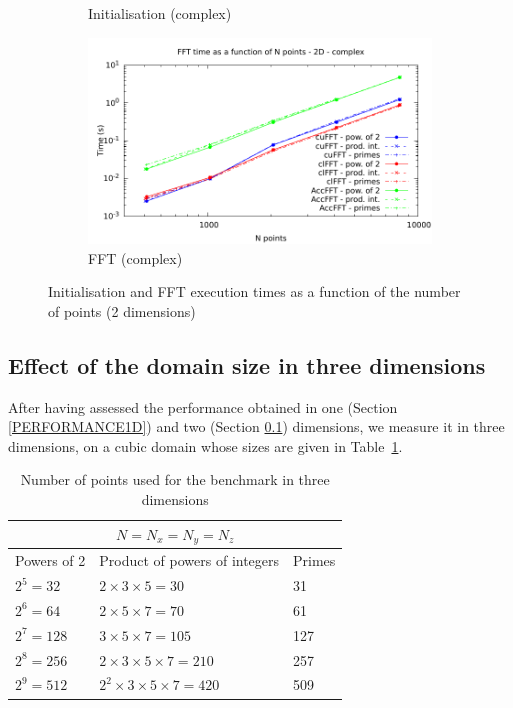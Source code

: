 \documentclass[12pt, a4paper]{article}
\begin{document}
\begin{figure}[htb]
\begin{subfigure}{.5\textwidth}
\caption{Initialisation (complex)}
\label{FFT2DCI}
\end{subfigure}%
\begin{subfigure}{.5\textwidth}
\centering
\includegraphics[width=.9\linewidth]{graphs/fft-2d-c-exec.pdf}
\caption{FFT (complex)}
\label{FFT2DCE}
\end{subfigure}
\caption{Initialisation and FFT execution times as a function of the number of points (2 dimensions)}
\label{FFT2D}
\end{figure}


\subsection{Effect of the domain size in three dimensions}\label{PERFORMANCE3D}
After having assessed the performance obtained in one (Section
\ref{PERFORMANCE1D}) and two (Section \ref{PERFORMANCE3D}) dimensions,
we measure it in three dimensions, on a cubic domain whose sizes are
given in Table~\ref{3DSIZES}.

\begin{table}[H]
  \centering
  \captionsetup{width=0.8\linewidth}
\begin{tabular}{|l|l|l|}
  \hline
  \multicolumn{3}{|c|}{$N=N_x=N_y=N_z$}\\
  \hline
  \hline
Powers of 2 & Product of powers of integers & Primes\\ \hline
$2^5 = 32$ & $2\times 3\times 5 =	30$ & 31\\ \hline
$2^6 = 64$ & $2\times 5\times 7 = 70$ & 61\\ \hline
$2^7 = 128$ & $3\times 5\times 7 = 105$ & 127\\ \hline
$2^8 = 256$ & $2\times 3\times 5\times 7 = 210$ & 257\\ \hline
$2^9 = 512$ & $2^2\times 3\times 5\times 7 = 420$ & 509\\ \hline
\end{tabular}
\caption{Number of points used for the benchmark in three dimensions}\label{3DSIZES}
\end{table}
\end{document}
